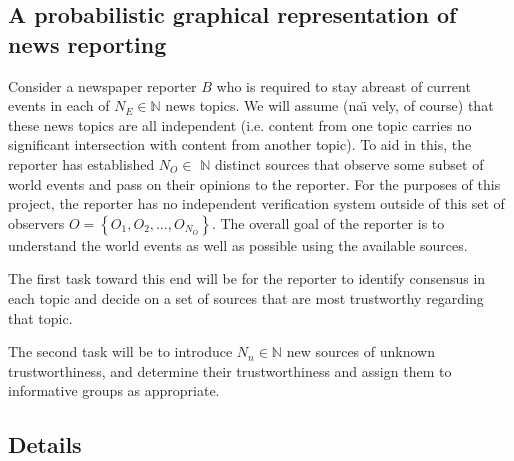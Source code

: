 \documentclass{amsart}
\theoremstyle{definition}
\theoremstyle{plain}
\numberwithin{equation}{section}
\begin{document}
\subsection{A probabilistic graphical representation of news reporting}

Consider a newspaper reporter $B$ who is required to stay abreast of current
events in each of $N_{E}\in \mathbb{N}$ news topics. We will assume (na\"{\i}%
vely, of course) that these news topics are all independent (i.e. content
from one topic carries no significant intersection with content from another
topic). To aid in this, the reporter has established $N_{O}\in $ $\mathbb{N}$
distinct sources that observe some subset of world events and pass on their
opinions to the reporter. For the purposes of this project, the reporter has
no independent verification system outside of this set of observers $%
O=\left\{ O_{1},O_{2},\dots ,O_{N_{O}}\right\} $. The overall goal of the
reporter is to understand the world events as well as possible using the
available sources. 

The first task toward this end will be for the reporter to identify
consensus in each topic and decide on a set of sources that are most
trustworthy regarding that topic. 

The second task will be to introduce $N_{n}\in \mathbb{N}$ new sources of
unknown trustworthiness, and determine their trustworthiness and assign them
to informative groups as appropriate.


\subsection{Details}
\end{document}
